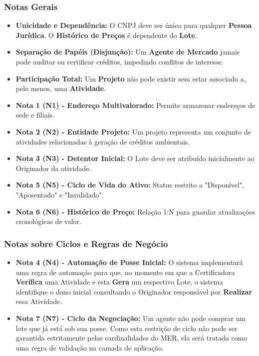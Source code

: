 \documentclass[12pt]{article}
\begin{document}
\subsubsection{Notas Gerais}
\begin{itemize}
    \item \textbf{Unicidade e Dependência:} O CNPJ deve ser único para qualquer \textbf{Pessoa Jurídica}. O \textbf{Histórico de Preços} é dependente do \textbf{Lote}.
    \item \textbf{Separação de Papéis (Disjunção):} Um \textbf{Agente de Mercado} jamais pode auditar ou certificar créditos, impedindo conflitos de interesse.
    \item \textbf{Participação Total:} Um \textbf{Projeto} não pode existir sem estar associado a, pelo menos, uma \textbf{Atividade}.
    \item \textbf{Nota 1 (N1) - Endereço Multivalorado:} Permite armazenar endereços de sede e filiais.
    \item \textbf{Nota 2 (N2) - Entidade Projeto:} Um projeto representa um conjunto de atividades relacionadas à geração de créditos ambientais.
    \item \textbf{Nota 3 (N3) - Detentor Inicial:} O Lote deve ser atribuído inicialmente ao Originador da atividade.
    \item \textbf{Nota 5 (N5) - Ciclo de Vida do Ativo:} Status restrito a "Disponível", "Aposentado" e "Invalidado".
    \item \textbf{Nota 6 (N6) - Histórico de Preço:} Relação 1:N para guardar atualizações cronológicas de valor.
\end{itemize}

\subsubsection{Notas sobre Ciclos e Regras de Negócio}
\begin{itemize}
    \item \textbf{Nota 4 (N4) - Automação de Posse Inicial:} O sistema implementará uma regra de automação para que, no momento em que a Certificadora \textbf{Verifica} uma Atividade e esta \textbf{Gera} um respectivo Lote, o sistema identifique o dono inicial consultando o Originador responsável por \textbf{Realizar} essa Atividade.
    \item \textbf{Nota 7 (N7) - Ciclo da Negociação:} Um agente não pode comprar um lote que já está sob sua posse. Como esta restrição de ciclo não pode ser garantida estritamente pelas cardinalidades do MER, ela será tratada como uma regra de validação na camada de aplicação.
\end{itemize}
\end{document}
